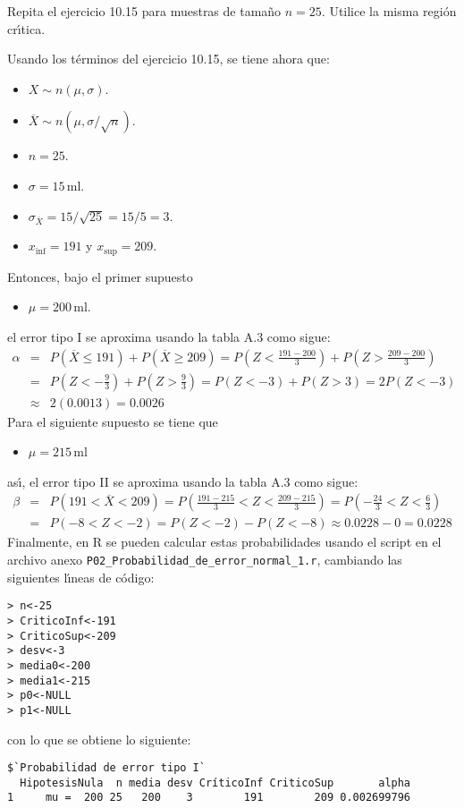 \begin{enunciado}
 Repita el ejercicio 10.15 para muestras de tama\~no $n = 25$. Utilice la misma regi\'on cr\'{\i}tica.
\end{enunciado}

\begin{solucion}
 Usando los t\'erminos del ejercicio 10.15, se tiene ahora que:
 \begin{itemize}
  \item $X \sim n(\mu, \sigma)$.
  \item $\overline{X} \sim n\left( \mu, \sigma/\sqrt{n} \right)$.
  \item $n = 25$.
  \item $\sigma = 15\,$ml.
  \item $\sigma_{\overline{X}} = 15/\sqrt{25} = 15/5 = 3$.
  \item $x_{\text{inf}} = 191$ y $x_{\text{sup}} = 209$.
 \end{itemize}
 Entonces, bajo el primer supuesto
 \begin{itemize}
  \item $\mu = 200\,$ml.
 \end{itemize}
 el error tipo I se aproxima usando la tabla A.3 como sigue:
 \begin{eqnarray*}
  \alpha & = & P\left( \overline{X} \leq 191 \right) + P\left( \overline{X} \geq 209 \right) = P\left( Z < \frac{191 - 200}{3} \right) + P\left( Z > \frac{209 - 200}{3} \right) \\
  & = & P\left( Z < -\frac{9}{3} \right) + P\left( Z > \frac{9}{3} \right) = P(Z < -3) + P(Z > 3) = 2P(Z < -3) \\
  & \approx & 2(0.0013) = 0.0026
 \end{eqnarray*}
 Para el siguiente supuesto se tiene que
 \begin{itemize}
  \item $\mu = 215\,$ml
 \end{itemize}
 as\'{\i}, el error tipo II se aproxima usando la tabla A.3 como sigue:
 \begin{eqnarray*}
  \beta & = & P\left( 191 < \overline{X} < 209 \right) = P\left( \frac{191-215}{3} < Z < \frac{209 - 215}{3} \right) = P\left( -\frac{24}{3} < Z < \frac{6}{3} \right) \\
  & = & P(-8 < Z < -2) = P(Z < -2) - P(Z < -8) \approx 0.0228 - 0 = 0.0228
 \end{eqnarray*}
 Finalmente, en R se pueden calcular estas probabilidades usando el script en el archivo anexo \texttt{P02\_Probabilidad\_de\_error\_normal\_1.r}, cambiando las siguientes l\'{\i}neas de c\'odigo:
 \begin{verbatim}
> n<-25
> CriticoInf<-191
> CriticoSup<-209
> desv<-3
> media0<-200
> media1<-215
> p0<-NULL
> p1<-NULL
 \end{verbatim}
 \vspace{-0.5cm}
 con lo que se obtiene lo siguiente:
 \begin{verbatim}
$`Probabilidad de error tipo I`
  HipotesisNula  n media desv CríticoInf CriticoSup       alpha
1     mu =  200 25   200    3        191        209 0.002699796


\end{verbatim}
\end{solucion}
